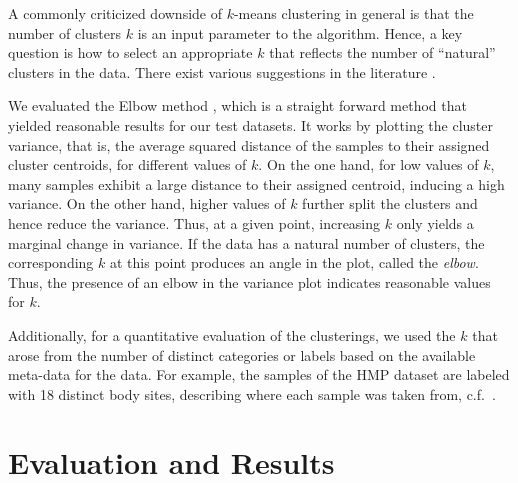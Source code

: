 A commonly criticized downside of $k$-means clustering in general is
that the number of clusters $k$ is an input parameter to the algorithm.
Hence, a key question is how to select an appropriate $k$
that reflects the number of ``natural'' clusters in the data.
There exist various suggestions in the literature
\cite{Thorndike1953,Rousseeuw1987,Bischof1999,Pelleg2000,Tibshirani2001,Hamerly2004}.

We evaluated the Elbow method \cite{Thorndike1953},
which is a straight forward method that yielded reasonable results for our test datasets.
It works by plotting the cluster variance,
that is, the average squared distance of the samples to their assigned cluster centroids,
for different values of $k$.
On the one hand, for low values of $k$, many samples exhibit a large distance to their assigned centroid,
inducing a high variance.
On the other hand, higher values of $k$ further split the clusters and hence reduce the variance.
Thus, at a given point, increasing $k$ only yields a marginal change in variance.
If the data has a natural number of clusters, the corresponding $k$ at this point produces an angle in the plot,
called the \emph{elbow}.
Thus, the presence of an elbow in the variance plot indicates reasonable values for $k$.

Additionally, for a quantitative evaluation of the clusterings,
we used the $k$ that arose from the number of distinct categories or labels based on the available meta-data for the data.
For example, the samples of the \ac{HMP} dataset are labeled with \num{18} distinct body sites,
describing where each sample was taken from, c.f.~.


\section{Evaluation and Results}
\label{ch:Clustering:sec:Results}

